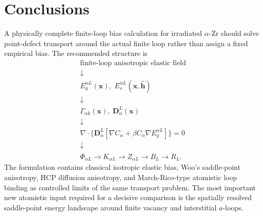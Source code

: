 \documentclass[11pt]{article}
\newcommand{\bD}{\bm{D}}
\newcommand{\bx}{\bm{x}}
\newcommand{\bh}{\bm{h}}
\begin{document}
\section{Conclusions}
A physically complete finite-loop bias calculation for irradiated $\alpha$-Zr should solve point-defect transport around the actual finite loop rather than assign a fixed empirical bias. The recommended structure is
\begin{equation}
\boxed{
\begin{array}{c}
\text{finite-loop anisotropic elastic field}\\
\downarrow\\
E_g^{\alpha L}(\bx),\;E_s^{\alpha L}(\bx,\hat{\bh})\\
\downarrow\\
\Gamma_{\alpha k}(\bx),\;\bD_\alpha^L(\bx)\\
\downarrow\\
\nabla\cdot\{\bD_\alpha^L[\nabla C_\alpha+\beta C_\alpha\nabla E_g^{\alpha L}]\}=0\\
\downarrow\\
\Phi_{\alpha L}\rightarrow K_{\alpha L}\rightarrow Z_{\alpha L}\rightarrow B_L\rightarrow\dot R_L.
\end{array}}
\end{equation}
The formulation contains classical isotropic elastic bias, Woo's saddle-point anisotropy, HCP diffusion anisotropy, and March-Rico-type atomistic loop binding as controlled limits of the same transport problem. The most important new atomistic input required for a decisive comparison is the spatially resolved saddle-point energy landscape around finite vacancy and interstitial $a$-loops.
\end{document}
